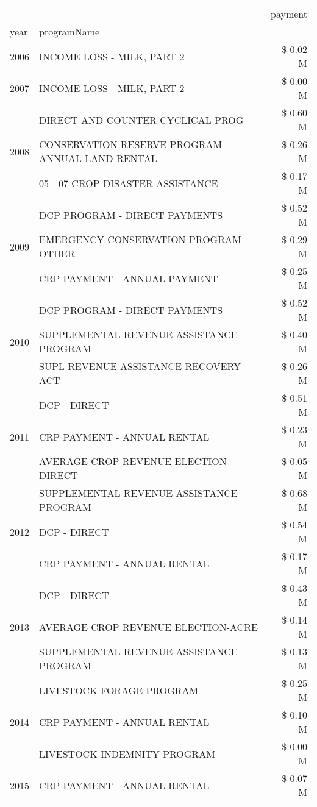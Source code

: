 \begin{tabular}{llr}
\toprule
 &  & payment \\
year & programName &  \\
\midrule
2006 & INCOME LOSS - MILK, PART 2 & \$ 0.02 M \\
\cline{1-3}
2007 & INCOME LOSS - MILK, PART 2 & \$ 0.00 M \\
\cline{1-3}
\multirow[t]{3}{*}{2008} & DIRECT AND COUNTER CYCLICAL PROG & \$ 0.60 M \\
 & CONSERVATION RESERVE PROGRAM - ANNUAL LAND RENTAL & \$ 0.26 M \\
 & 05 - 07 CROP DISASTER ASSISTANCE & \$ 0.17 M \\
\cline{1-3}
\multirow[t]{3}{*}{2009} & DCP PROGRAM - DIRECT PAYMENTS & \$ 0.52 M \\
 & EMERGENCY CONSERVATION PROGRAM - OTHER & \$ 0.29 M \\
 & CRP PAYMENT - ANNUAL PAYMENT & \$ 0.25 M \\
\cline{1-3}
\multirow[t]{3}{*}{2010} & DCP PROGRAM - DIRECT PAYMENTS & \$ 0.52 M \\
 & SUPPLEMENTAL REVENUE ASSISTANCE PROGRAM & \$ 0.40 M \\
 & SUPL REVENUE ASSISTANCE RECOVERY ACT & \$ 0.26 M \\
\cline{1-3}
\multirow[t]{3}{*}{2011} & DCP - DIRECT & \$ 0.51 M \\
 & CRP PAYMENT - ANNUAL RENTAL & \$ 0.23 M \\
 & AVERAGE CROP REVENUE ELECTION-DIRECT & \$ 0.05 M \\
\cline{1-3}
\multirow[t]{3}{*}{2012} & SUPPLEMENTAL REVENUE ASSISTANCE PROGRAM & \$ 0.68 M \\
 & DCP - DIRECT & \$ 0.54 M \\
 & CRP PAYMENT - ANNUAL RENTAL & \$ 0.17 M \\
\cline{1-3}
\multirow[t]{3}{*}{2013} & DCP - DIRECT & \$ 0.43 M \\
 & AVERAGE CROP REVENUE ELECTION-ACRE & \$ 0.14 M \\
 & SUPPLEMENTAL REVENUE ASSISTANCE PROGRAM & \$ 0.13 M \\
\cline{1-3}
\multirow[t]{3}{*}{2014} & LIVESTOCK FORAGE PROGRAM & \$ 0.25 M \\
 & CRP PAYMENT - ANNUAL RENTAL & \$ 0.10 M \\
 & LIVESTOCK INDEMNITY PROGRAM & \$ 0.00 M \\
\cline{1-3}
\multirow[t]{3}{*}{2015} & CRP PAYMENT - ANNUAL RENTAL & \$ 0.07 M \\

\end{tabular}
